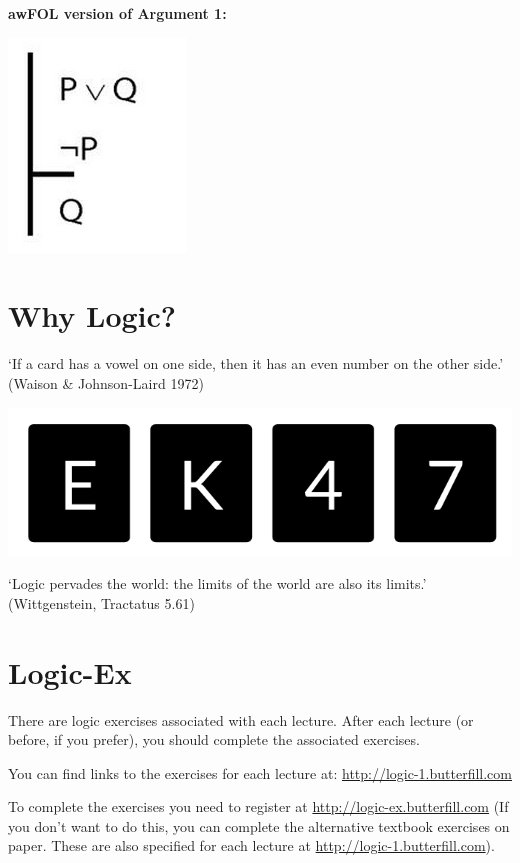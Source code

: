 \documentclass[12pt]{extarticle}
\begin{document}
\begin{multicols*}{3}
\begin{minipage}{\columnwidth}
\textbf{awFOL version of Argument 1:}
 
\begin{center}
\includegraphics[scale=0.3]{img/argument1_fol.png}
\end{center}
\end{minipage}
 
 
 
\section{Why Logic?}
 
‘If a card has a vowel on one side, then it has an even number on the other side.’
(Waison \& Johnson-Laird 1972)
 
\begin{center}
\includegraphics[scale=0.3]{img/waison_fig.png}
\end{center}
‘Logic pervades the world: the limits of the world are also its limits.’
(Wittgenstein, Tractatus 5.61)
 
 
\section{Logic-Ex}
 
There are logic exercises associated with each lecture. After each lecture (or before, if you prefer), you should complete the associated exercises.
 
You can find links to the exercises for each lecture at: \url{http://logic-1.butterfill.com}
 
To complete the exercises you need to register at \url{http://logic-ex.butterfill.com} (If you don’t want to do this, you can complete the alternative textbook exercises on paper. These are also specified for each lecture at \url{http://logic-1.butterfill.com}).
 

\end{multicols*}
\end{document}
